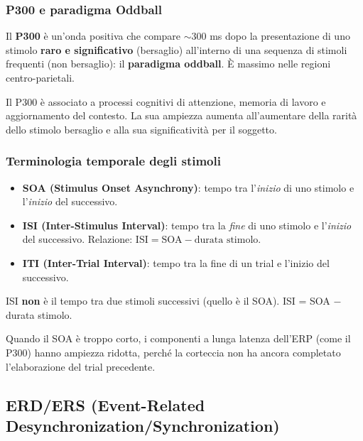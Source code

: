 \subsubsection{P300 e paradigma Oddball}

\begin{definizione}[-- P300]
Il \textbf{P300} è un'onda positiva che compare $\sim 300$ ms dopo la presentazione di uno stimolo \textbf{raro e significativo} (bersaglio) all'interno di una sequenza di stimoli frequenti (non bersaglio): il \textbf{paradigma oddball}. È massimo nelle regioni centro-parietali.
\end{definizione}

Il P300 è associato a processi cognitivi di attenzione, memoria di lavoro e aggiornamento del contesto. La sua ampiezza aumenta all'aumentare della rarità dello stimolo bersaglio e alla sua significatività per il soggetto.

\subsubsection{Terminologia temporale degli stimoli}

\begin{itemize}
    \item \textbf{SOA (Stimulus Onset Asynchrony)}: tempo tra l'\textit{inizio} di uno stimolo e l'\textit{inizio} del successivo.
    \item \textbf{ISI (Inter-Stimulus Interval)}: tempo tra la \textit{fine} di uno stimolo e l'\textit{inizio} del successivo. Relazione: $\text{ISI} = \text{SOA} - \text{durata stimolo}$.
    \item \textbf{ITI (Inter-Trial Interval)}: tempo tra la fine di un trial e l'inizio del successivo.
\end{itemize}

\begin{attenzione}[]
ISI \textbf{non} è il tempo tra due stimoli successivi (quello è il SOA). ISI = SOA $-$ durata stimolo.
\end{attenzione}

Quando il SOA è troppo corto, i componenti a lunga latenza dell'ERP (come il P300) hanno ampiezza ridotta, perché la corteccia non ha ancora completato l'elaborazione del trial precedente.

\subsection{ERD/ERS (Event-Related Desynchronization/Synchronization)}


